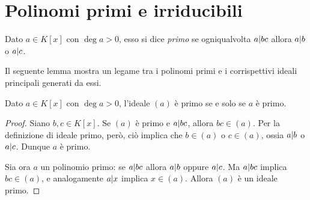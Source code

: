 \begin{comment}
Risaliamo da esso ai polinomi di partenza sostituendo i vari resti dalle equazioni precedenti:
\begin{equation*}
	\begin{split}
		4x-5&=\Big(\frac{64}{41}x-\frac{80}{41}\Big)\cdot\frac{41}{16}=\\
		&=\Big(\frac{64}{41}x-\frac{80}{41}\Big)\Big[x^2+4-\Big(\frac14x+\frac5{16}\Big)(4x-5)\Big]=\\
		&=\Big(\frac{64}{41}x-\frac{80}{41}\Big)\Big\{x^2+4-\Big(\frac14x+\frac5{16}\Big)[x^3-5-x(x^2+4)]\Big\}
	\end{split}
\end{equation*}
da cui si ricava l'identità di B\'ezout per $a$ e $b$
\begin{equation*}
	\begin{split}
		4x-5&=-\Big(\frac{64}{41}x-\frac{80}{41}\Big)\Big(\frac14x+\frac5{16}\Big)(x^3-5)+\Big(\frac{64}{41}x-\frac{80}{41}\Big)\Big[1+x\Big(\frac14x+\frac5{16}\Big)\Big](x^2+4)=\\
		&=\Big(-\frac{16}{41}x^2-\frac{25}{41}\Big)(x^3-5)+\Big(\frac{16}{41}x^3+\frac{39}{41}x-\frac{80}{41}\Big)(x^2+4)		
	\end{split}
\end{equation*}
\end{comment}

\section{Polinomi primi e irriducibili}
\begin{definizione} \label{d:polinomio-primo}
	Dato $a\in K[x]$ con $\deg a>0$, esso si dice \emph{primo} se ogniqualvolta $a| bc$ allora $a| b$ o $a| c$.
\end{definizione}
Il seguente lemma mostra un legame tra i polinomi primi e i corrispettivi ideali principali generati da essi.
\begin{lemma} \label{l:ideale-polinomio-primo}
	Dato $a\in K[x]$ con $\deg a>0$, l'ideale $(a)$ è primo se e solo se $a$ è primo.
\end{lemma}
\begin{proof}
	Siano $b,c\in K[x]$.
	Se $(a)$ è primo e $a| bc$, allora $bc\in(a)$.
	Per la definizione di ideale primo, però, ciò implica che $b\in(a)$ o $c\in(a)$, ossia $a| b$ o $a| c$.
	Dunque $a$ è primo.

	Sia ora $a$ un polinomio primo: se $a| bc$ allora $a| b$ oppure $a| c$.
	Ma $a| bc$ implica $bc\in(a)$, e analogamente $a| x$ implica $x\in(a)$.
	Allora $(a)$ è un ideale primo.
\end{proof}

